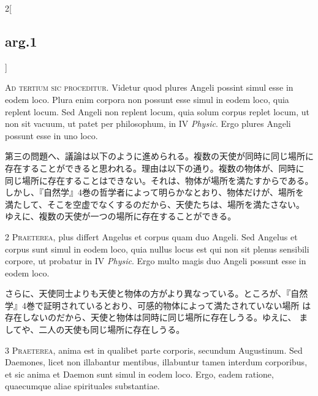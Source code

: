 \documentclass[paper=a4paper,fontsize=10pt,jafontsize=9pt,titlepage]{jlreq}
\begin{document}
\begin{paracol}{2}[\subsection{arg.1}]

{\huge A}{\scshape d tertium sic proceditur}. Videtur quod
 plures Angeli possint simul esse in eodem loco. Plura enim corpora non
 possunt esse simul in eodem loco, quia replent locum. Sed Angeli non
 replent locum, quia solum corpus replet locum, ut non sit vacuum, ut
 patet per philosophum, in IV {\itshape Physic}. Ergo plures Angeli possunt esse in
 uno loco.

\switchcolumn

第三の問題へ、議論は以下のように進められる。複数の天使が同時に同じ場所に
 存在することができると思われる。理由は以下の通り。複数の物体が、同時に
 同じ場所に存在することはできない。それは、物体が場所を満たすからである。
 しかし、『自然学』4巻の哲学者によって明らかなとおり、物体だけが、場所を
 満たして、そこを空虚でなくするのだから、天使たちは、場所を満たさない。
 ゆえに、複数の天使が一つの場所に存在することができる。


{\scshape 2 Praeterea}, plus differt Angelus et corpus
 quam duo Angeli. Sed Angelus et corpus sunt simul in eodem loco, quia
 nullus locus est qui non sit plenus sensibili corpore, ut probatur in
 IV {\itshape Physic}. Ergo multo magis duo Angeli possunt esse in eodem loco.

\switchcolumn

さらに、天使同士よりも天使と物体の方がより異なっている。ところが、『自然
 学』4巻で証明されているとおり、可感的物体によって満たされていない場所
 は存在しないのだから、天使と物体は同時に同じ場所に存在しうる。ゆえに、
 ましてや、二人の天使も同じ場所に存在しうる。


{\scshape 3 Praeterea}, anima est in qualibet parte
 corporis, secundum Augustinum. Sed Daemones, licet non illabantur
 mentibus, illabuntur tamen interdum corporibus, et sic anima et Daemon
 sunt simul in eodem loco. Ergo, eadem ratione, quaecumque aliae
 spirituales substantiae.


\end{paracol}
\end{document}
